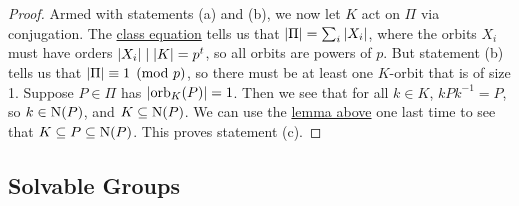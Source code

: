 \begin{proof}
    Armed with statements (a) and (b),
    we now let \(K\) act on \(\Pi\) via conjugation.
    The \hyperref[thm:class-equation]{class equation} tells us that
    \(\abs{\Pi} = \sum_i \abs{X_i}\),
    where the orbits \(X_i\)
    must have orders \(\abs{X_i} \mid \abs{K} = p^t\),
    so all orbits are powers of \(p\).
    But statement (b) tells us that \(\abs{\Pi} \equiv 1 \pmod{p}\),
    so there must be at least one \(K\)-orbit that is of size 1.
    Suppose \(P \in \Pi\) has \(\abs{\operatorname{orb}_K(P)} = 1\).
    Then we see that for all \(k \in K\), \(kPk^{-1} = P\),
    so \(k \in \operatorname{N}(P)\), and \(K \subseteq \operatorname{N}(P)\).
    We can use the \hyperref[lem:prime-power-sylow-subgroup]{lemma above}
    one last time
    to see that \(K \subseteq P \subseteq \operatorname{N}(P)\).
    This proves statement (c).
\end{proof}


\subsection{Solvable Groups}


